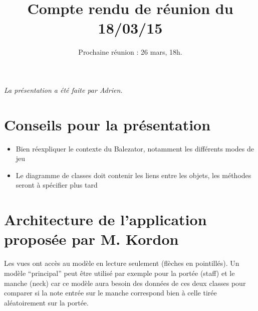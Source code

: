 \documentclass{scrartcl}
\begin{document}

\title{Compte rendu de réunion du 18/03/15}
\subtitle{Prochaine réunion : 26 mars, 18h.\vspace{-5ex}}
\date{}
\maketitle


\textit{La présentation a été faite par Adrien.}

\section{Conseils pour la présentation}
\begin{itemize}
	\item  Bien réexpliquer le contexte du Balezator, notamment les différents modes de jeu
	\item  Le diagramme de classes doit contenir les liens entre les objets, les méthodes seront à spécifier plus tard
\end{itemize}

\section{Architecture de l'application proposée par M. Kordon}


\noindent Les vues ont accès au modèle en lecture seulement (flèches en pointillés). \newline
Un modèle \enquote{principal} peut être utilisé par exemple pour la portée (staff) et le manche (neck) car ce modèle aura besoin des données de ces deux classes pour comparer si la note entrée sur le manche correspond bien à celle tirée aléatoirement sur la portée.
\end{document}
